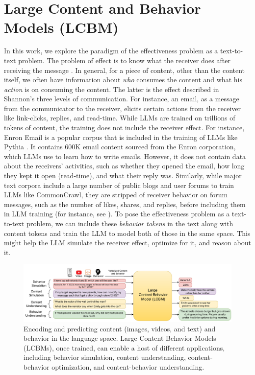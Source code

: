 \section{Large Content and Behavior Models (LCBM)}
\label{sec:Large Content and Behavior Models (LCBM)}
In this work, we explore the paradigm of the effectiveness problem as a text-to-text problem. The problem of effect is to know what the receiver does after receiving the message \cite{shannon-weaver-1949}. In general, for a piece of content, other than the content itself, we often have information about \textit{who} consumes the content and what his \textit{action} is on consuming the content. The latter is the effect described in Shannon's three levels of communication. For instance, an email, as a message from the communicator to the receiver, elicits certain actions from the receiver like link-clicks, replies, and read-time. While LLMs are trained on trillions of tokens of content, the training does not include the receiver effect. For instance, Enron Email \cite{klimt2004enron} is a popular corpus that is included in the training of LLMs like Pythia \cite{biderman2023pythia}. It contains 600K email content sourced from the Enron corporation, which LLMs use to learn how to write emails. However, it does not contain data about the receivers' activities, such as whether they opened the email, how long they kept it open (read-time), and what their reply was. Similarly, while major text corpora include a large number of public blogs and user forums to train LLMs like CommonCrawl, they are stripped of receiver behavior on forum messages, such as the number of likes, shares, and replies, before including them in LLM training (for instance, see \cite{biderman2022datasheet,penedo2023refinedweb}). 
To pose the effectiveness problem as a text-to-text problem, we can include these \textit{behavior tokens} in the text along with content tokens and train the LLM to model both of those in the same space. This might help the LLM simulate the receiver effect, optimize for it, and reason about it. 





\begin{figure}[!ht]
    \centering
    \includegraphics[width=\textwidth]{images/fig1-lcbm.pdf}
    \caption{Encoding and predicting content (images, videos, and text) and behavior in the language space. Large Content Behavior Models (LCBMs), once trained, can enable a host of different applications, including behavior simulation, content understanding, content-behavior optimization, and content-behavior understanding.}
    \label{fig:figure-1-lcbm}
\end{figure}

